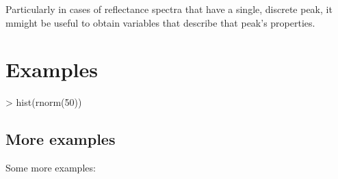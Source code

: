 \documentclass{article}
\begin{document}
Particularly in cases of reflectance spectra that have a single, discrete peak, it mmight be useful to obtain variables that describe that peak's properties. 


\section*{Examples}


\begin{Schunk}
\begin{Sinput}
> hist(rnorm(50))
\end{Sinput}
\end{Schunk}


\subsection*{More examples}

Some more examples:


\end{document}
